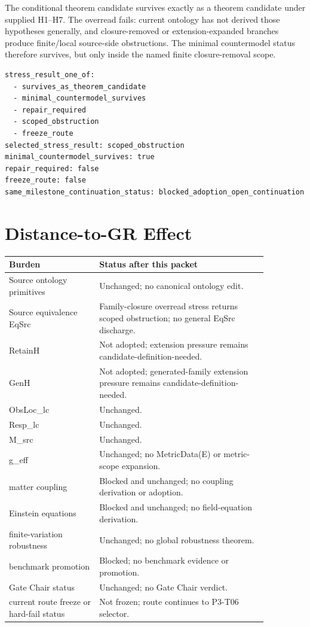 \documentclass[11pt]{article}
\begin{document}
The conditional theorem candidate survives exactly as a theorem candidate under
supplied H1--H7. The overread fails: current ontology has not derived those
hypotheses generally, and closure-removed or extension-expanded branches
produce finite/local source-side obstructions. The minimal countermodel status
therefore survives, but only inside the named finite closure-removal scope.

\begin{verbatim}
stress_result_one_of:
  - survives_as_theorem_candidate
  - minimal_countermodel_survives
  - repair_required
  - scoped_obstruction
  - freeze_route
selected_stress_result: scoped_obstruction
minimal_countermodel_survives: true
repair_required: false
freeze_route: false
same_milestone_continuation_status: blocked_adoption_open_continuation
\end{verbatim}

\section{Distance-to-GR Effect}

\begin{longtable}{p{0.30\linewidth}p{0.56\linewidth}}
\toprule
Burden & Status after this packet \\
\midrule
Source ontology primitives & Unchanged; no canonical ontology edit. \\
Source equivalence EqSrc & Family-closure overread stress returns scoped obstruction; no general EqSrc discharge. \\
RetainH & Not adopted; extension pressure remains candidate-definition-needed. \\
GenH & Not adopted; generated-family extension pressure remains candidate-definition-needed. \\
ObsLoc\_lc & Unchanged. \\
Resp\_lc & Unchanged. \\
M\_src & Unchanged. \\
g\_eff & Unchanged; no MetricData(E) or metric-scope expansion. \\
matter coupling & Blocked and unchanged; no coupling derivation or adoption. \\
Einstein equations & Blocked and unchanged; no field-equation derivation. \\
finite-variation robustness & Unchanged; no global robustness theorem. \\
benchmark promotion & Blocked; no benchmark evidence or promotion. \\
Gate Chair status & Unchanged; no Gate Chair verdict. \\
current route freeze or hard-fail status & Not frozen; route continues to P3-T06 selector. \\
\bottomrule
\end{longtable}
\end{document}
